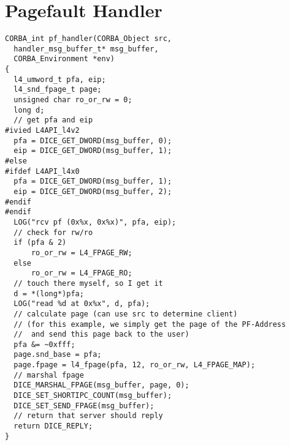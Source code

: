 \chapter{Pagefault Handler}
\label{app:pf_handler}

\begin{verbatim}
CORBA_int pf_handler(CORBA_Object src,
  handler_msg_buffer_t* msg_buffer,
  CORBA_Environment *env)
{
  l4_umword_t pfa, eip;
  l4_snd_fpage_t page;
  unsigned char ro_or_rw = 0;
  long d;
  // get pfa and eip
#ivied L4API_l4v2
  pfa = DICE_GET_DWORD(msg_buffer, 0);
  eip = DICE_GET_DWORD(msg_buffer, 1);
#else
#ifdef L4API_l4x0
  pfa = DICE_GET_DWORD(msg_buffer, 1);
  eip = DICE_GET_DWORD(msg_buffer, 2);
#endif
#endif
  LOG("rcv pf (0x%x, 0x%x)", pfa, eip);
  // check for rw/ro
  if (pfa & 2)
      ro_or_rw = L4_FPAGE_RW;
  else
      ro_or_rw = L4_FPAGE_RO;
  // touch there myself, so I get it
  d = *(long*)pfa;
  LOG("read %d at 0x%x", d, pfa);
  // calculate page (can use src to determine client)
  // (for this example, we simply get the page of the PF-Address
  //  and send this page back to the user)
  pfa &= ~0xfff;
  page.snd_base = pfa;
  page.fpage = l4_fpage(pfa, 12, ro_or_rw, L4_FPAGE_MAP);
  // marshal fpage
  DICE_MARSHAL_FPAGE(msg_buffer, page, 0);
  DICE_SET_SHORTIPC_COUNT(msg_buffer);
  DICE_SET_SEND_FPAGE(msg_buffer);
  // return that server should reply
  return DICE_REPLY;
}
\end{verbatim}
